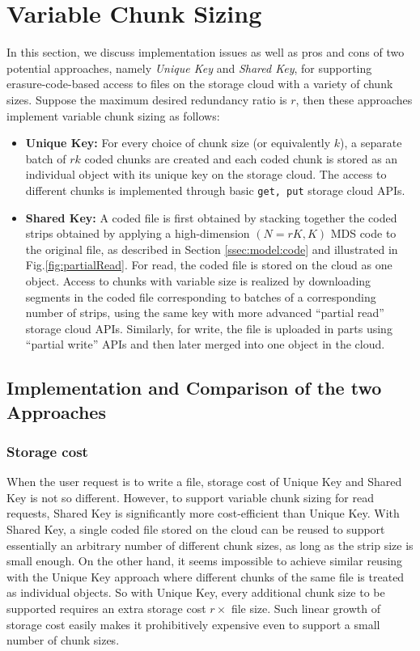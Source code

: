 \documentclass[journal]{IEEEtran}
\newif\ifnewtext
\begin{document}
\section{Variable Chunk Sizing}
\label{sec:measurement}


\ifnewtext
In this section, we discuss implementation issues as well as pros and cons of two potential approaches, namely {\em Unique Key} and {\em Shared Key}, for supporting erasure-code-based access to files on the storage cloud with a variety of chunk sizes. Suppose the maximum desired redundancy ratio is $r$, then these approaches implement variable chunk sizing as follows:
\begin{itemize}
\item {\bf Unique Key:} For every choice of chunk size (or equivalently $k$), a separate batch of $rk$ coded chunks are created and each coded chunk is stored as an individual object with its unique key on the storage cloud. The access to different chunks is implemented through basic {\tt get, put} storage cloud APIs. 

\item {\bf Shared Key:} A coded file is first obtained by stacking together the coded strips obtained by applying a high-dimension $(N=rK,K)$ MDS code to the original file, as described in Section \ref{ssec:model:code} and illustrated in Fig.\ref{fig:partialRead}. 
For read, the coded file is stored on the cloud as one object. Access to chunks with variable size is realized by downloading segments in the coded file corresponding to batches of a corresponding number of strips, using the same key with more advanced ``partial read'' storage cloud APIs. Similarly, for write, the file is uploaded in parts using ``partial write'' APIs and then later merged into one object in the cloud.
\end{itemize}




\subsection{Implementation and Comparison of the two Approaches}
\label{ssec:measurement:partialRead}

\subsubsection{Storage cost} When the user request is to write a file, storage cost of Unique Key and Shared Key is not so different. However, to support variable chunk sizing for read requests, Shared Key is significantly more cost-efficient than Unique Key. With Shared Key, a single coded file stored on the cloud can be reused to support essentially an arbitrary number of different chunk sizes, as long as the strip size is small enough. On the other hand, it seems impossible to achieve similar reusing with the Unique Key approach where different chunks of the same file is treated as individual objects. So with Unique Key, every additional chunk size to be supported requires an extra storage cost $r\times$ file size. Such linear growth of storage cost easily makes it prohibitively expensive even to support a small number of chunk sizes.
\end{document}
